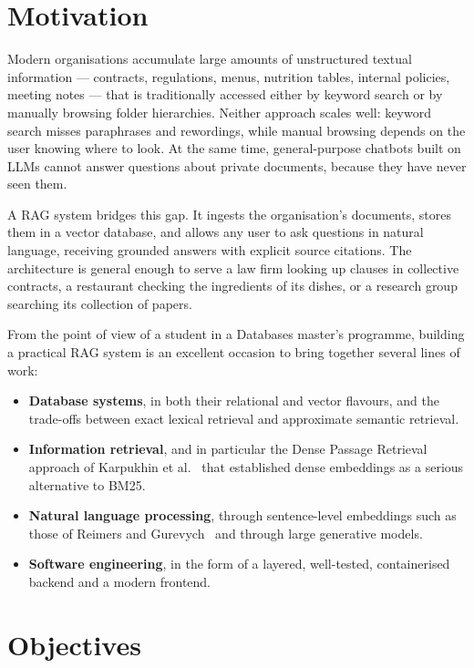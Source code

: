 \section{Motivation}
\label{sec:motivation}

Modern organisations accumulate large amounts of unstructured textual
information --- contracts, regulations, menus, nutrition tables, internal
policies, meeting notes --- that is traditionally accessed either by keyword
search or by manually browsing folder hierarchies. Neither approach scales
well: keyword search misses paraphrases and rewordings, while manual browsing
depends on the user knowing where to look. At the same time, general-purpose
chatbots built on LLMs cannot answer questions about private documents,
because they have never seen them.

A RAG system bridges this gap. It ingests the organisation's documents, stores
them in a vector database, and allows any user to ask questions in natural
language, receiving grounded answers with explicit source citations. The
architecture is general enough to serve a law firm looking up clauses in
collective contracts, a restaurant checking the ingredients of its dishes, or
a research group searching its collection of papers.

From the point of view of a student in a Databases master's programme,
building a practical RAG system is an excellent occasion to bring together
several lines of work:
\begin{itemize}
  \item \textbf{Database systems}, in both their relational and vector
        flavours, and the trade-offs between exact lexical retrieval and
        approximate semantic retrieval.
  \item \textbf{Information retrieval}, and in particular the Dense Passage
        Retrieval approach of Karpukhin et al.~\cite{Karpukhin2020DPR} that
        established dense embeddings as a serious alternative to BM25.
  \item \textbf{Natural language processing}, through sentence-level
        embeddings such as those of Reimers and
        Gurevych~\cite{Reimers2019SentenceBERT} and through large generative
        models.
  \item \textbf{Software engineering}, in the form of a layered, well-tested,
        containerised backend and a modern frontend.
\end{itemize}

\section{Objectives}
\label{sec:objectives}

